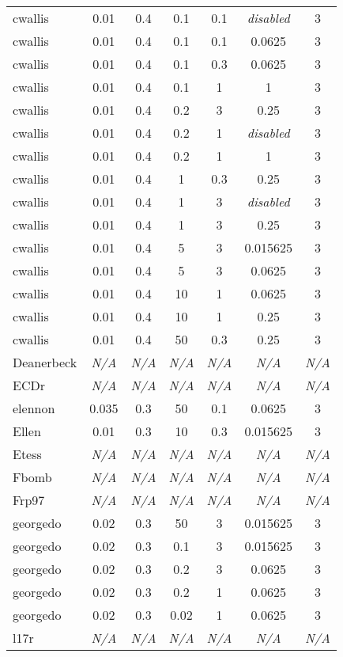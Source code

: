 \begin{figure}[h]
\begin{tabular}{@{}l c c c c c c@{}}
cwallis & 0.01 & 0.4 & 0.1 & 0.1 & \emph{disabled} & 3 \\
cwallis & 0.01 & 0.4 & 0.1 & 0.1 & 0.0625 & 3 \\
cwallis & 0.01 & 0.4 & 0.1 & 0.3 & 0.0625 & 3 \\
cwallis & 0.01 & 0.4 & 0.1 & 1 & 1 & 3 \\
cwallis & 0.01 & 0.4 & 0.2 & 3 & 0.25 & 3 \\
cwallis & 0.01 & 0.4 & 0.2 & 1 & \emph{disabled} & 3 \\
cwallis & 0.01 & 0.4 & 0.2 & 1 & 1 & 3 \\
cwallis & 0.01 & 0.4 & 1 & 0.3 & 0.25 & 3 \\
cwallis & 0.01 & 0.4 & 1 & 3 & \emph{disabled} & 3 \\
cwallis & 0.01 & 0.4 & 1 & 3 & 0.25 & 3 \\
cwallis & 0.01 & 0.4 & 5 & 3 & 0.015625 & 3 \\
cwallis & 0.01 & 0.4 & 5 & 3 & 0.0625 & 3 \\
cwallis & 0.01 & 0.4 & 10 & 1 & 0.0625 & 3 \\
cwallis & 0.01 & 0.4 & 10 & 1 & 0.25 & 3 \\
cwallis & 0.01 & 0.4 & 50 & 0.3 & 0.25 & 3 \\
Deanerbeck & \emph{N/A} & \emph{N/A} & \emph{N/A} & \emph{N/A} & \emph{N/A} & \emph{N/A} \\
ECDr & \emph{N/A} & \emph{N/A} & \emph{N/A} & \emph{N/A} & \emph{N/A} & \emph{N/A} \\
elennon & 0.035 & 0.3 & 50 & 0.1 & 0.0625 & 3 \\
Ellen & 0.01 & 0.3 & 10 & 0.3 & 0.015625 & 3 \\
Etess & \emph{N/A} & \emph{N/A} & \emph{N/A} & \emph{N/A} & \emph{N/A} & \emph{N/A} \\
Fbomb & \emph{N/A} & \emph{N/A} & \emph{N/A} & \emph{N/A} & \emph{N/A} & \emph{N/A} \\
Frp97 & \emph{N/A} & \emph{N/A} & \emph{N/A} & \emph{N/A} & \emph{N/A} & \emph{N/A} \\
georgedo & 0.02 & 0.3 & 50 & 3 & 0.015625 & 3 \\
georgedo & 0.02 & 0.3 & 0.1 & 3 & 0.015625 & 3 \\
georgedo & 0.02 & 0.3 & 0.2 & 3 & 0.0625 & 3 \\
georgedo & 0.02 & 0.3 & 0.2 & 1 & 0.0625 & 3 \\
georgedo & 0.02 & 0.3 & 0.02 & 1 & 0.0625 & 3 \\
l17r & \emph{N/A} & \emph{N/A} & \emph{N/A} & \emph{N/A} & \emph{N/A} & \emph{N/A} \\

\end{tabular}
\end{figure}
